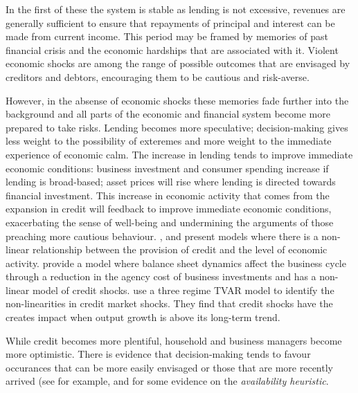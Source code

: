 \documentclass[12pt, a4paper, oneside]{article} %
\begin{document}
In the first of these the system is stable as lending is not excessive, revenues are generally sufficient to ensure that repayments of principal and interest can be made from current income.  This period may be framed by memories of past financial crisis and the economic hardships that are associated with it.  Violent economic shocks are among the range of possible outcomes that are envisaged by creditors and debtors, encouraging them to be cautious and risk-averse. 

However, in the absense of economic shocks these memories fade further into the background and all parts of the economic and financial system become more prepared to take risks.  Lending becomes more speculative; decision-making gives less weight to the possibility of exteremes and more weight to the immediate experience of economic calm.  The increase in lending tends to improve immediate economic conditions:  business investment and consumer spending increase if lending is broad-based; asset prices will rise where lending is directed towards financial investment.  This increase in economic activity that comes from the expansion in credit will feedback to improve immediate economic conditions, exacerbating the sense of well-being and undermining the arguments of those preaching more cautious behaviour.  \citet{Bernanke1999chapter}, \citet{BernankeGertler} and \citet{Azaraidis} present models where there is a non-linear relationship between  the provision of credit and the level of economic activity. \citet{BernankeGertlerAgency} provide a model where balance sheet dynamics affect the business cycle through a reduction in the agency cost of business investments and \citet{Balke} has a non-linear model of credit shocks.  \citet{Avdjiev2014} use a three regime TVAR model to identify the non-linearities in credit market shocks.  They find that credit shocks have the creates impact when output growth is above its long-term trend. 

While credit becomes more plentiful, household and business managers become more optimistic.  There is evidence that decision-making tends to favour occurances that can be more easily envisaged or those that are more recently arrived (see for example, \citet{KTAvailability} and \citet{Schwartzavailability} for some evidence on the \emph{availability heuristic}.   %
\end{document}
